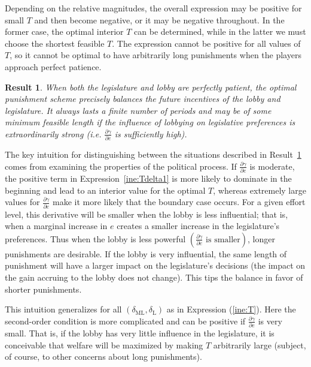 \documentclass[authoryear, review]{elsarticle}
\newtheorem{result}{Result}
\newcommand{\ga}{\gamma}
\newcommand{\de}{\delta}
\begin{document}
Depending on the relative magnitudes, the overall expression may be positive for small $T$ and then become negative, or it may be negative throughout. In the former case, the optimal interior $T$ can be determined, while in the latter we must choose the shortest feasible $T$. The expression cannot be positive for all values of $T$, so it cannot be optimal to have arbitrarily long punishments when the players approach perfect patience.

\begin{result}
  When both the legislature and lobby are perfectly patient, the optimal punishment scheme precisely balances the future incentives of the lobby and legislature. It always lasts a finite number of periods and may be of some minimum feasible length if the influence of lobbying on legislative preferences is extraordinarily strong (i.e. $\frac{\partial \ga}{\partial e}$ is sufficiently high).
  \label{res:opt1}
\end{result}

The key intuition for distinguishing between the situations described in Result~\ref{res:opt1} comes from examining the properties of the political process. If $\frac{\partial \ga}{\partial e}$ is moderate, the positive term in Expression~\ref{ine:Tdelta1} is more likely to dominate in the beginning and lead to an interior value for the optimal $T$, whereas extremely large values for $\frac{\partial \ga}{\partial e}$ make it more likely that the boundary case occurs. For a given effort level, this derivative will be smaller when the lobby is less influential; that is, when a marginal increase in $e$ creates a smaller increase in the legislature's preferences. Thus when the lobby is less powerful $\left(\frac{\partial \ga}{\partial e}\text{ is smaller}\right)$, longer punishments are desirable. If the lobby is very influential, the same length of punishment will have a larger impact on the legislature's decisions (the impact on the gain accruing to the lobby does not change). This tips the balance in favor of shorter punishments.

This intuition generalizes for all $\left(\de_\text{ML},\de_\text{L}\right)$ as in Expression (\ref{ine:T}). Here the second-order condition is more complicated and can be positive if $\frac{\partial \ga}{\partial e}$ is very small. That is, if the lobby has very little influence in the legislature, it is conceivable that welfare will be maximized by making $T$ arbitrarily large (subject, of course, to other concerns about long punishments).
\end{document}
